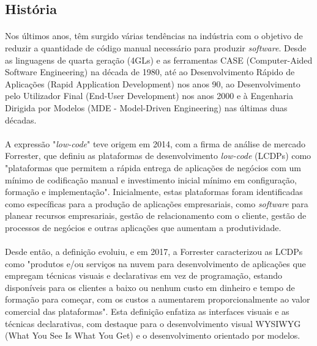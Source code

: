 \documentclass[pdflatex,sn-mathphys-num]{sn-jnl}
\theoremstyle{thmstyleone}
\theoremstyle{thmstyletwo}
\theoremstyle{thmstylethree}
\begin{document}
\subsection{História}\label{}

\paragraph{}Nos últimos anos, têm surgido várias tendências na indústria com o objetivo de reduzir a quantidade de código manual necessário para produzir \textit{software}. Desde as linguagens de quarta geração (4GLs) e as ferramentas CASE (Computer-Aided Software Engineering) na década de 1980, até ao Desenvolvimento Rápido de Aplicações (Rapid Application Development) nos anos 90, ao Desenvolvimento pelo Utilizador Final (End-User Development) nos anos 2000 e à Engenharia Dirigida por Modelos (MDE - Model-Driven Engineering) nas últimas duas décadas.\cite{bib2}

\paragraph{}A expressão "\textit{low-code}" teve origem em 2014, com a firma de análise de mercado Forrester, que definiu as plataformas de desenvolvimento \textit{low-code} (LCDPs) como "plataformas que permitem a rápida entrega de aplicações de negócios com um mínimo de codificação manual e investimento inicial mínimo em configuração, formação e implementação". Inicialmente, estas plataformas foram identificadas como específicas para a produção de aplicações empresariais, como \textit{software} para planear recursos empresariais, gestão de relacionamento com o cliente, gestão de processos de negócios e outras aplicações que aumentam a produtividade.\cite{bib2}

\paragraph{}Desde então, a definição evoluiu, e em 2017, a Forrester caracterizou as LCDPs como "produtos e/ou serviços na nuvem para desenvolvimento de aplicações que empregam técnicas visuais e declarativas em vez de programação, estando disponíveis para os clientes a baixo ou nenhum custo em dinheiro e tempo de formação para começar, com os custos a aumentarem proporcionalmente ao valor comercial das plataformas". Esta definição enfatiza as interfaces visuais e as técnicas declarativas, com destaque para o desenvolvimento visual WYSIWYG (What You See Is What You Get) e o desenvolvimento orientado por modelos.\cite{bib2}
\end{document}
